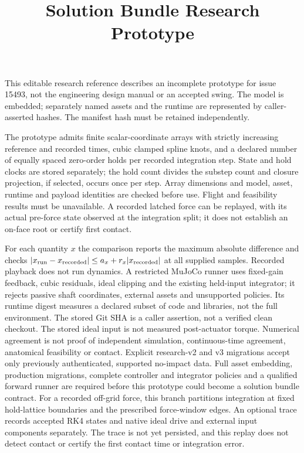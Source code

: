\documentclass{article}
\title{Solution Bundle Research Prototype}
\begin{document}
\maketitle
This editable research reference describes an incomplete prototype for issue
15493, not the engineering design manual or an accepted swing. The model is
embedded; separately named assets and the runtime are represented by
caller-asserted hashes. The manifest hash must be retained independently.

The prototype admits finite scalar-coordinate arrays with strictly increasing
reference and recorded times, cubic clamped spline knots, and a declared
number of equally spaced zero-order holds per recorded integration step.
State and hold clocks are stored separately; the hold count divides the
substep count and closure projection, if selected, occurs once per step.
Array dimensions and model,
asset, runtime and payload identities are checked before use. Flight and
feasibility results must be unavailable. A recorded latched force can be
replayed, with its actual pre-force state observed at the integration split;
it does not establish an on-face root or certify first contact.

For each quantity $x$ the comparison reports the maximum absolute difference
and checks $|x_{\rm run}-x_{\rm recorded}| \le a_x+r_x|x_{\rm recorded}|$ at
all supplied samples. Recorded playback does not run dynamics. A restricted
MuJoCo runner uses fixed-gain feedback, cubic residuals, ideal clipping and
the existing held-input integrator; it rejects passive shaft
coordinates, external assets and unsupported policies. Its runtime digest
measures a declared subset of code and libraries, not the full environment.
The stored Git SHA is a caller assertion, not a verified clean checkout.
The stored ideal input is not measured post-actuator torque. Numerical
agreement is not proof of independent simulation, continuous-time agreement,
anatomical feasibility or contact. Explicit research-v2 and v3 migrations
accept only previously authenticated, supported no-impact data. Full asset embedding, production migrations,
complete controller and integrator policies and a qualified forward runner
are required before this prototype could become a solution bundle contract.
For a recorded off-grid force, this branch partitions integration at fixed
hold-lattice boundaries and the prescribed force-window edges. An optional
trace records accepted RK4 states and native ideal drive and external input
components separately. The trace is not yet persisted, and this replay does
not detect contact or certify the first contact time or integration error.
\end{document}
